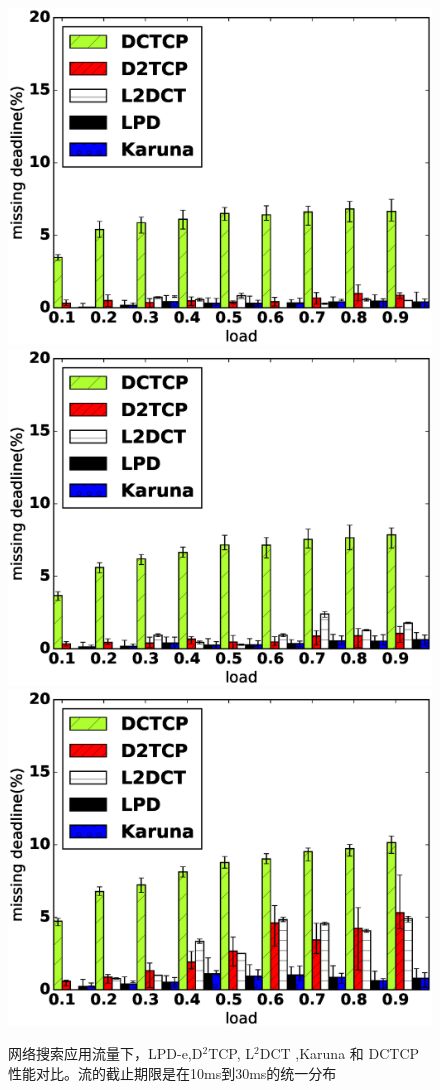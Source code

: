 \begin{figure}[h]
\centering
{}
 {\includegraphics[width=0.32\columnwidth]{figures/LPD/spineleaf/miss_deadline_1.eps}}
{\includegraphics[width=0.32\columnwidth]{figures/LPD/spineleaf/miss_deadline_5.eps}}
{\includegraphics[width=0.32\columnwidth]{figures/LPD/spineleaf/miss_deadline_10.eps}}
\caption{网络搜索应用流量下，LPD-e,D$^2$TCP, L$^2$DCT ,Karuna 和 DCTCP性能对比。流的截止期限是在10ms到30ms的统一分布}
\label{spine-dc-web-10}
\end{figure}



